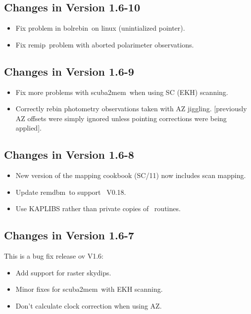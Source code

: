 \documentclass[twoside,11pt]{article}
\newcommand{\Kappa}{\xref{{\sc{Kappa}}}{sun95}{}}
\newcommand{\task}[1]{{\sf #1}}
\newcommand{\bolrebin}{\htmlref{\task{bolrebin}}{BOLREBIN}}
\newcommand{\remdbm}{\htmlref{\task{remdbm}}{REMDBM}}
\newcommand{\remip}{\htmlref{\task{remip}}{REMIP}}
\newcommand{\scubamem}{\htmlref{\task{scuba2mem}}{SCUBA2MEM}}
\newcommand{\htmlref}[2]{#1}
\newcommand{\xref}[3]{#1}
\renewcommand{\_}{\texttt{\symbol{95}}}
\begin{document}
\subsection{Changes in Version 1.6-10}

\begin{itemize}
\item Fix problem in \bolrebin\ on linux (unintialized pointer).
\item Fix \remip\ problem with aborted polarimeter observations.
\end{itemize}

\subsection{Changes in Version 1.6-9}

\begin{itemize}
\item Fix more problems with \scubamem\ when using SC (EKH) scanning.
\item Correctly rebin photometry observations taken with AZ jiggling.
    [previously AZ offsets were simply ignored unless pointing
     corrections were being applied].
\end{itemize}

\subsection{Changes in Version 1.6-8}

\begin{itemize}
\item New version of the mapping cookbook (\xref{SC/11}{sc11}{}) now includes
  scan mapping.
\item Update \remdbm\ to support \Kappa\ V0.18.
\item Use \xref{KAPLIBS}{sun238}{} rather than private copies of \Kappa\ routines.
\end{itemize}

\subsection{Changes in Version 1.6-7}

This is a bug fix release ov V1.6:

\begin{itemize}
\item Add support for raster skydips.
\item Minor fixes for \scubamem\ with EKH scanning.
\item Don't calculate clock correction when using AZ.
\end{itemize}
\end{document}
